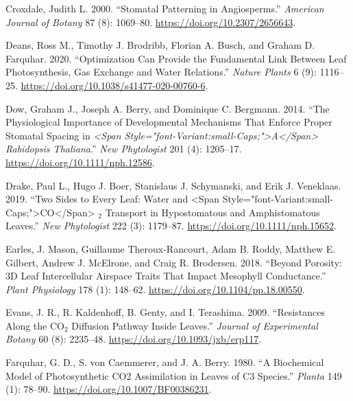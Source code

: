 \documentclass[12pt,halfline,a4paper,]{ouparticle}
\newlength{\cslhangindent}
\newlength{\cslentryspacingunit} %
\newenvironment{CSLReferences}[2] %
 {%
  \setlength{\parindent}{0pt}
  \ifodd #1
  \let\oldpar\par
  \def\par{\hangindent=\cslhangindent\oldpar}
  \fi
  \setlength{\parskip}{#2\cslentryspacingunit}
 }%
 {}
\begin{document}
\begin{CSLReferences}{1}{0}
\leavevmode{}%
Croxdale, Judith L. 2000. {``Stomatal Patterning in Angiosperms.''}
\emph{American Journal of Botany} 87 (8): 1069--80.
\url{https://doi.org/10.2307/2656643}.

\leavevmode{}%
Deans, Ross M., Timothy J. Brodribb, Florian A. Busch, and Graham D.
Farquhar. 2020. {``Optimization Can Provide the Fundamental Link Between
Leaf Photosynthesis, Gas Exchange and Water Relations.''} \emph{Nature
Plants} 6 (9): 1116--25.
\url{https://doi.org/10.1038/s41477-020-00760-6}.

\leavevmode{}%
Dow, Graham J., Joseph A. Berry, and Dominique C. Bergmann. 2014. {``The
Physiological Importance of Developmental Mechanisms That Enforce Proper
Stomatal Spacing in \emph{{\textless{}}Span
Style="font-Variant:small-Caps;"{\textgreater{}}{A}{\textless{}}/Span{\textgreater{}}
Rabidopsis Thaliana}.''} \emph{New Phytologist} 201 (4): 1205--17.
\url{https://doi.org/10.1111/nph.12586}.

\leavevmode{}%
Drake, Paul L., Hugo J. Boer, Stanislaus J. Schymanski, and Erik J.
Veneklaas. 2019. {``Two Sides to Every Leaf: Water and {\textless{}}Span
Style="font-Variant:small-Caps;"{\textgreater{}}{CO}{\textless{}}/Span{\textgreater{}}
\(_{\textrm{2}}\) Transport in Hypostomatous and Amphistomatous
Leaves.''} \emph{New Phytologist} 222 (3): 1179--87.
\url{https://doi.org/10.1111/nph.15652}.

\leavevmode{}%
Earles, J. Mason, Guillaume Theroux-Rancourt, Adam B. Roddy, Matthew E.
Gilbert, Andrew J. McElrone, and Craig R. Brodersen. 2018. {``Beyond
{Porosity}: {3D} {Leaf} {Intercellular} {Airspace} {Traits} {That}
{Impact} {Mesophyll} {Conductance}.''} \emph{Plant Physiology} 178 (1):
148--62. \url{https://doi.org/10.1104/pp.18.00550}.

\leavevmode{}%
Evans, J. R., R. Kaldenhoff, B. Genty, and I. Terashima. 2009.
{``Resistances Along the {CO}\(_{\textrm{2}}\) Diffusion Pathway Inside
Leaves.''} \emph{Journal of Experimental Botany} 60 (8): 2235--48.
\url{https://doi.org/10.1093/jxb/erp117}.

\leavevmode{}%
Farquhar, G. D., S. von Caemmerer, and J. A. Berry. 1980. {``A
Biochemical Model of Photosynthetic {CO2} Assimilation in Leaves of {C3}
Species.''} \emph{Planta} 149 (1): 78--90.
\url{https://doi.org/10.1007/BF00386231}.


\end{CSLReferences}
\end{document}
